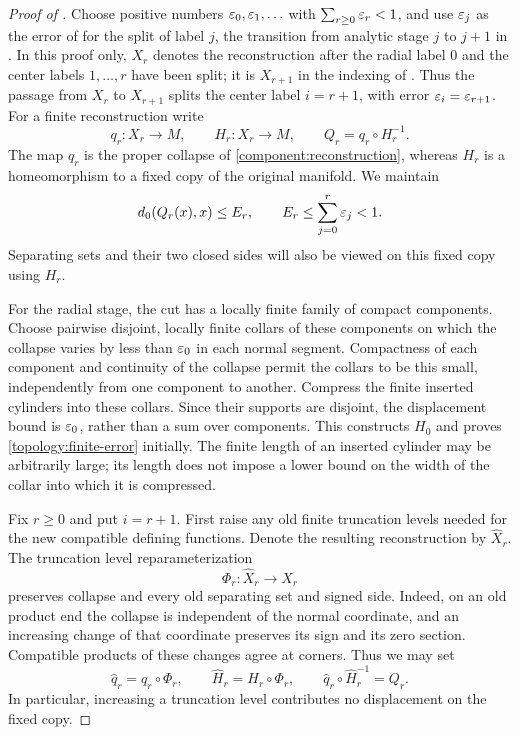 \begin{proof}[Proof of ]
Choose positive numbers $\varepsilon_0,\varepsilon_1,\ldots$ with
$\sum_{r\ge0}\varepsilon_r<1$, and use $\varepsilon_j$ as the error of
 for the split of label $j$, the transition
from analytic stage $j$ to $j+1$ in .  In this
proof only, $X_r$ denotes the reconstruction after the radial label $0$ and
the center labels $1,\ldots,r$ have been split; it is $X_{r+1}$ in the
indexing of .  Thus the
passage from $X_r$ to $X_{r+1}$ splits the center label $i=r+1$, with
error $\varepsilon_i=\varepsilon_{r+1}$.
For a finite reconstruction write
\[
 q_r:X_r\longrightarrow M,\qquad
 H_r:X_r\longrightarrow M,\qquad
 Q_r=q_r\circ H_r^{-1}.
\]
The map $q_r$ is the proper collapse of
\cref{component:reconstruction}, whereas $H_r$ is a homeomorphism to a
fixed copy of the original manifold.  We maintain
\begin{equation}\label{topology:finite-error}
 d_0(Q_r(x),x)\le E_r,
 \qquad E_r\le\sum_{j=0}^{r}\varepsilon_j<1.
\end{equation}
Separating sets and their two closed sides will also be viewed on this fixed copy
using $H_r$.

For the radial stage, the cut has a locally finite family of compact
components.  Choose pairwise disjoint, locally finite collars of these
components on which the collapse varies by less than $\varepsilon_0$ in each
normal segment.  Compactness of each component and continuity of the
collapse permit the collars to be this small, independently from one
component to another.  Compress the finite inserted cylinders into
these collars.  Since their supports are disjoint, the displacement
bound is $\varepsilon_0$, rather than a sum over components.  This constructs
$H_0$ and proves \eqref{topology:finite-error} initially.  The finite
length of an inserted cylinder may be arbitrarily large; its length
does not impose a lower bound on the width of the collar into which it
is compressed.

Fix $r\ge0$ and put $i=r+1$. First raise any old finite
truncation levels needed for the new compatible defining functions.  Denote the
resulting reconstruction by $\widehat X_r$.  The truncation level
reparameterization
\[
 \Phi_r:\widehat X_r\longrightarrow X_r
\]
preserves collapse and every old separating set and signed side.  Indeed, on an
old product end the collapse is independent of the normal coordinate,
and an increasing change of that coordinate preserves its sign and its
zero section.  Compatible products of these changes agree at corners.
Thus we may set
\begin{equation}\label{topology:horizon}
 \widehat q_r=q_r\circ \Phi_r,\qquad
 \widehat H_r=H_r\circ \Phi_r,
 \qquad
 \widehat q_r\circ\widehat H_r^{-1}=Q_r.
\end{equation}
In particular, increasing a truncation level contributes no displacement on the
fixed copy.


\end{proof}
